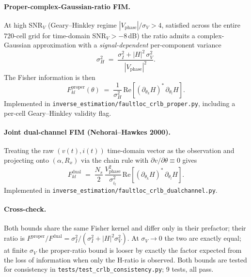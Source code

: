 \documentclass[11pt,a4paper]{article}
\begin{document}
\paragraph{Proper-complex-Gaussian-ratio FIM.}
At high SNR$_V$ (Geary--Hinkley regime
$|V_{\mathrm{phase}}|/\sigma_V > 4$, satisfied across the entire
720-cell grid for time-domain SNR$_V > -8$\,dB) the ratio admits a
complex-Gaussian approximation with a \emph{signal-dependent}
per-component variance
\begin{equation}
   \sigma_H^2 \;=\;
       \frac{\sigma_I^2 + |H|^2\,\sigma_V^2}{|V_{\mathrm{phase}}|^2}.
\end{equation}
The Fisher information is then
\begin{equation}
   F^{\mathrm{proper}}_{kl}(\theta) \;=\; \frac{1}{\sigma_H^2}\,
         \mathrm{Re}\!\left[
           \left(\partial_{\theta_k} H\right)^{\!*}
           \,\partial_{\theta_l} H
         \right].
\end{equation}
Implemented in \texttt{inverse\_estimation/faultloc\_crlb\_proper.py},
including a per-cell Geary--Hinkley validity flag.

\paragraph{Joint dual-channel FIM (Nehorai--Hawkes 2000).}
Treating the raw $(v(t), i(t))$ time-domain vector as the observation
and projecting onto $(\alpha, R_x)$ via the chain rule with
$\partial v/\partial\theta \equiv 0$ gives
\begin{equation}
   F^{\mathrm{dual}}_{kl}
        \;=\;
        \frac{N_s}{2}\,\frac{V_{\mathrm{phase}}^2}{\sigma_{i_t}^2}\,
        \mathrm{Re}\!\left[
          \left(\partial_{\theta_k} H\right)^{\!*}
          \,\partial_{\theta_l} H
        \right].
\end{equation}
Implemented in
\texttt{inverse\_estimation/faultloc\_crlb\_dualchannel.py}.

\paragraph{Cross-check.}
Both bounds share the same Fisher kernel and differ only in their
prefactor; their ratio is
$F^{\mathrm{proper}}/F^{\mathrm{dual}} =
\sigma_I^2 / (\sigma_I^2 + |H|^2 \sigma_V^2)$.
At $\sigma_V \to 0$ the two are exactly equal; at finite $\sigma_V$
the proper-ratio bound is looser by exactly the factor expected from
the loss of information when only the H-ratio is observed.  Both
bounds are tested for consistency in
\texttt{tests/test\_crlb\_consistency.py}; 9 tests, all pass.
\end{document}
